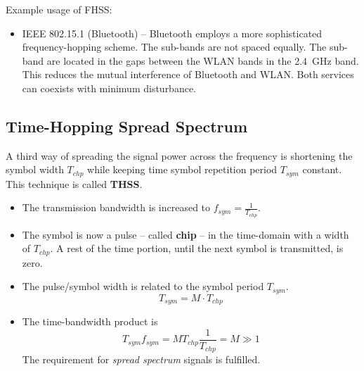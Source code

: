 \begin{refsection}
Example usage of \ac{FHSS}:
\begin{itemize}
	\item \acs{IEEE} 802.15.1 (Bluetooth) -- Bluetooth employs a more sophisticated frequency-hopping scheme. The sub-bands are not spaced equally. The sub-band are located in the gaps between the \ac{WLAN} bands in the \SI{2.4}{GHz} band. This reduces the mutual interference of Bluetooth and \ac{WLAN}. Both services can coexists with minimum disturbance.
\end{itemize}

\subsection{Time-Hopping Spread Spectrum}

A third way of spreading the signal power across the frequency is shortening the symbol width $T_{chp}$ while keeping time symbol repetition period $T_{sym}$ constant. This technique is called  \textbf{\acf{THSS}}.
\begin{itemize}
	\item The transmission bandwidth is increased to $f_{sym} = \frac{1}{T_{chp}}$.
	\item The symbol is now a pulse -- called  \textbf{chip} -- in the time-domain with a width of $T_{chp}$. A rest of the time portion, until the next symbol is transmitted, is zero.
	\item The pulse/symbol width is related to the symbol period $T_{sym}$.
	\begin{equation}
		T_{sym} = M \cdot T_{chp}
	\end{equation}
	\item The time-bandwidth product is
	\begin{equation}
		T_{sym} f_{sym} = M T_{chp} \frac{1}{T_{chp}} = M \gg 1
	\end{equation}
	The requirement for \emph{spread spectrum} signals is fulfilled.
\end{itemize}


\end{refsection}
